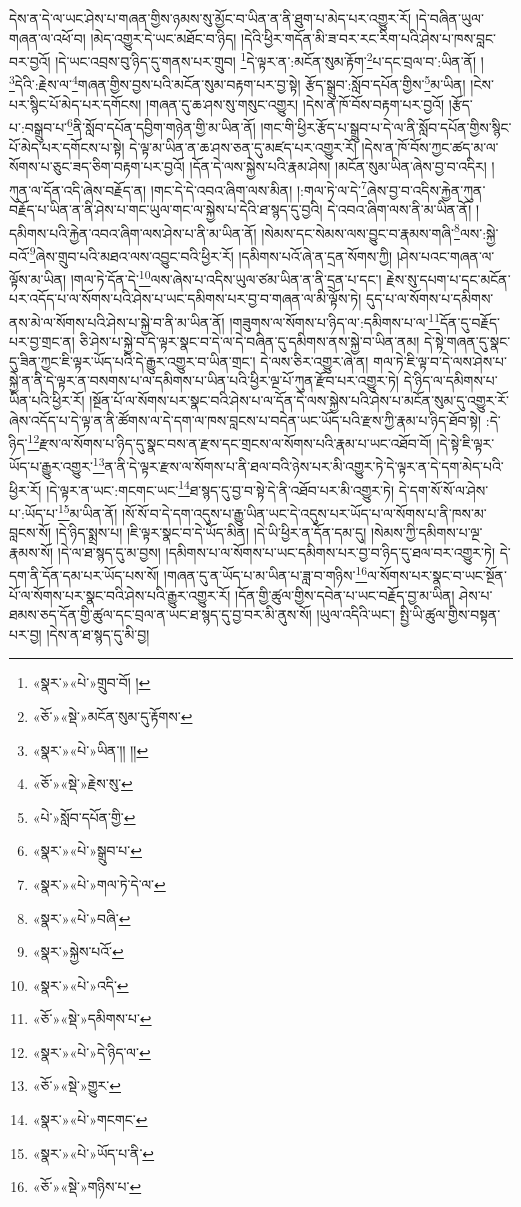 དེས་ན་དེ་ལ་ཡང་ཤེས་པ་གཞན་གྱིས་ཉམས་སུ་མྱོང་བ་ཡིན་ན་ནི་ཐུག་པ་མེད་པར་འགྱུར་རོ། །དེ་བཞིན་ཡུལ་གཞན་ལ་འཕོ་བ། །མེད་འགྱུར་དེ་ཡང་མཐོང་བ་ཉིད། །དེའི་ཕྱིར་གདོན་མི་ཟ་བར་རང་རིག་པའི་ཤེས་པ་ཁས་བླང་བར་བྱའོ། །དེ་ཡང་འབྲས་བུ་ཉིད་དུ་གནས་པར་གྲུབ། \footnote{«སྣར་»«པེ་»གྲུབ་བོ། ། }དེ་ལྟར་ན་:མངོན་སུམ་རྟོག་\footnote{«ཅོ་»«སྡེ་»མངོན་སུམ་དུ་རྟོགས་}པ་དང་བྲལ་བ་:ཡིན་ནོ། །\footnote{«སྣར་»«པེ་»ཡིན་།། །།}དེའི་:རྗེས་ལ་\footnote{«ཅོ་»«སྡེ་»རྗེས་སུ་}གཞན་གྱིས་བྱས་པའི་མངོན་སུམ་བརྟག་པར་བྱ་སྟེ། རྩོད་སྒྲུབ་:སློབ་དཔོན་གྱིས་\footnote{«པེ་»སློབ་དཔོན་གྱི་}མ་ཡིན། །ངེས་པར་སྙིང་པོ་མེད་པར་དགོངས། །གཞན་དུ་ཆ་ཤས་སུ་གསུང་འགྱུར། །དེས་ན་ཁོ་བོས་བརྟག་པར་བྱའོ། །རྩོད་པ་:བསྒྲུབ་པ་\footnote{«སྣར་»«པེ་»སྒྲུབ་པ་}ནི་སློབ་དཔོན་དབྱིག་གཉེན་གྱི་མ་ཡིན་ནོ། །གང་གི་ཕྱིར་རྩོད་པ་སྒྲུབ་པ་དེ་ལ་ནི་སློབ་དཔོན་གྱིས་སྙིང་པོ་མེད་པར་དགོངས་པ་སྟེ། དེ་ལྟ་མ་ཡིན་ན་ཆ་ཤས་ཅན་དུ་མཛད་པར་འགྱུར་རོ། །དེས་ན་ཁོ་བོས་ཀྱང་ཚད་མ་ལ་སོགས་པ་ཅུང་ཟད་ཅིག་བརྟག་པར་བྱའོ། །དོན་དེ་ལས་སྐྱེས་པའི་རྣམ་ཤེས། །མངོན་སུམ་ཡིན་ཞེས་བྱ་བ་འདིར། །ཀུན་ལ་དོན་འདི་ཞེས་བརྗོད་ན། །གང་དེ་དེ་འབའ་ཞིག་ལས་མིན། །:གལ་ཏེ་ལ་དེ་\footnote{«སྣར་»«པེ་»གལ་ཏེ་དེ་ལ་}ཞེས་བྱ་བ་འདིས་རྐྱེན་ཀུན་བརྗོད་པ་ཡིན་ན་ནི་ཤེས་པ་གང་ཡུལ་གང་ལ་སྐྱེས་པ་དེའི་ཐ་སྙད་དུ་བྱའི། དེ་འབའ་ཞིག་ལས་ནི་མ་ཡིན་ནོ། །དམིགས་པའི་རྐྱེན་འབའ་ཞིག་ལས་ཤེས་པ་ནི་མ་ཡིན་ནོ། །སེམས་དང་སེམས་ལས་བྱུང་བ་རྣམས་གཞི་\footnote{«སྣར་»«པེ་»བཞི་}ལས་:སྐྱེ་བའོ་\footnote{«སྣར་»སྐྱེས་པའོ་}ཞེས་གྲུབ་པའི་མཐའ་ལས་འབྱུང་བའི་ཕྱིར་རོ། །དམིགས་པའོ་ཞེ་ན་དྲན་སོགས་ཀྱི། །ཤེས་པའང་གཞན་ལ་ལྟོས་མ་ཡིན། །གལ་ཏེ་དོན་དེ་\footnote{«སྣར་»«པེ་»འདི་}ལས་ཞེས་པ་འདིས་ཡུལ་ཙམ་ཡིན་ན་ནི་དྲན་པ་དང་། རྗེས་སུ་དཔག་པ་དང་མངོན་པར་འདོད་པ་ལ་སོགས་པའི་ཤེས་པ་ཡང་དམིགས་པར་བྱ་བ་གཞན་ལ་མི་ལྟོས་ཏེ། དུད་པ་ལ་སོགས་པ་དམིགས་ནས་མེ་ལ་སོགས་པའི་ཤེས་པ་སྐྱེ་བ་ནི་མ་ཡིན་ནོ། །གཟུགས་ལ་སོགས་པ་ཉིད་ལ་:དམིགས་པ་ལ་\footnote{«ཅོ་»«སྡེ་»དམིགས་པ་}དོན་དུ་བརྗོད་པར་བྱ་གྲང་ན། ཅི་ཤེས་པ་སྐྱེ་བ་དེ་ལྟར་སྣང་བ་དེ་ལ་དེ་བཞིན་དུ་དམིགས་ནས་སྐྱེ་བ་ཡིན་ནམ། དེ་སྟེ་གཞན་དུ་སྣང་དུ་ཟིན་ཀྱང་ཇི་ལྟར་ཡོད་པའི་དེ་རྒྱུར་འགྱུར་བ་ཡིན་གྲང་། དེ་ལས་ཅིར་འགྱུར་ཞེ་ན། གལ་ཏེ་ཇི་ལྟ་བ་དེ་ལས་ཤེས་པ་སྐྱེ་ན་ནི་དེ་ལྟར་ན་བསགས་པ་ལ་དམིགས་པ་ཡིན་པའི་ཕྱིར་ལྔ་པོ་ཀུན་རྫོབ་པར་འགྱུར་ཏེ། དེ་ཉིད་ལ་དམིགས་པ་ཡིན་པའི་ཕྱིར་རོ། །སྔོན་པོ་ལ་སོགས་པར་སྣང་བའི་ཤེས་པ་ལ་དོན་དེ་ལས་སྐྱེས་པའི་ཤེས་པ་མངོན་སུམ་དུ་འགྱུར་རོ་ཞེས་འདོད་པ་དེ་ལྟ་ན་ནི་ཚོགས་ལ་དེ་དག་ལ་ཁས་བླངས་པ་བདེན་ཡང་ཡོད་པའི་རྫས་ཀྱི་རྣམ་པ་ཉིད་ཐོབ་སྟེ། :དེ་ཉིད་\footnote{«སྣར་»«པེ་»དེ་ཉིད་ལ་}རྫས་ལ་སོགས་པ་ཉིད་དུ་སྣང་བས་ན་རྫས་དང་གྲངས་ལ་སོགས་པའི་རྣམ་པ་ཡང་འཐོབ་བོ། །དེ་སྟེ་ཇི་ལྟར་ཡོད་པ་རྒྱུར་འགྱུར་\footnote{«ཅོ་»«སྡེ་»གྱུར་}ན་ནི་དེ་ལྟར་རྫས་ལ་སོགས་པ་ནི་ཐལ་བའི་ཉེས་པར་མི་འགྱུར་ཏེ་དེ་ལྟར་ན་དེ་དག་མེད་པའི་ཕྱིར་རོ། །དེ་ལྟར་ན་ཡང་:གངགང་ཡང་\footnote{«སྣར་»«པེ་»གངགང་}ཐ་སྙད་དུ་བྱ་བ་སྟེ་དེ་ནི་འཐོབ་པར་མི་འགྱུར་ཏེ། དེ་དག་སོ་སོ་ལ་ཤེས་པ་:ཡོད་པ་\footnote{«སྣར་»«པེ་»ཡོད་པ་ནི་}མ་ཡིན་ནོ། །སོ་སོ་བ་དེ་དག་འདུས་པ་རྒྱུ་ཡིན་ཡང་དེ་འདུས་པར་ཡོད་པ་ལ་སོགས་པ་ནི་ཁས་མ་བླངས་སོ། །དེ་ཉིད་སྨྲས་པ། །ཇི་ལྟར་སྣང་བ་དེ་ཡོད་མིན། །དེ་ཡི་ཕྱིར་ན་དོན་དམ་དུ། །སེམས་ཀྱི་དམིགས་པ་ལྔ་རྣམས་སོ། །དེ་ལ་ཐ་སྙད་དུ་མ་བྱས། །དམིགས་པ་ལ་སོགས་པ་ཡང་དམིགས་པར་བྱ་བ་ཉིད་དུ་ཐལ་བར་འགྱུར་ཏེ། དེ་དག་ནི་དོན་དམ་པར་ཡོད་པས་སོ། །གཞན་དུ་ན་ཡོད་པ་མ་ཡིན་པ་ཟླ་བ་གཉིས་\footnote{«ཅོ་»«སྡེ་»གཉིས་པ་}ལ་སོགས་པར་སྣང་བ་ཡང་སྔོན་པོ་ལ་སོགས་པར་སྣང་བའི་ཤེས་པའི་རྒྱུར་འགྱུར་རོ། །དོན་གྱི་ཚུལ་གྱིས་དབེན་པ་ཡང་བརྗོད་བྱ་མ་ཡིན། ཤེས་པ་ཐམས་ཅད་དོན་གྱི་ཚུལ་དང་བྲལ་ན་ཡང་ཐ་སྙད་དུ་བྱ་བར་མི་ནུས་སོ། །ཡུལ་འདིའི་ཡང་། སྤྱི་ཡི་ཚུལ་གྱིས་བསྟན་པར་བྱ། །དེས་ན་ཐ་སྙད་དུ་མི་བྱ། 